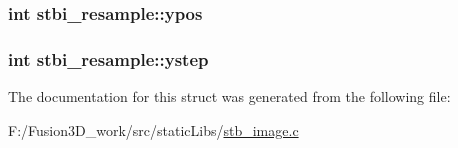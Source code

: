 \subsubsection[{ypos}]{\setlength{\rightskip}{0pt plus 5cm}int stbi\+\_\+resample\+::ypos}\label{structstbi__resample_aa1f1ad33e739f7a38fbad8752f64f983}
\hypertarget{structstbi__resample_a0c479143447d103e73348c89f8b4ef1c}{}
\subsubsection[{ystep}]{\setlength{\rightskip}{0pt plus 5cm}int stbi\+\_\+resample\+::ystep}\label{structstbi__resample_a0c479143447d103e73348c89f8b4ef1c}


The documentation for this struct was generated from the following file\+:\begin{DoxyCompactItemize}
\item 
F\+:/\+Fusion3\+D\+\_\+work/src/static\+Libs/\hyperlink{stb__image_8c}{stb\+\_\+image.\+c}\end{DoxyCompactItemize}
